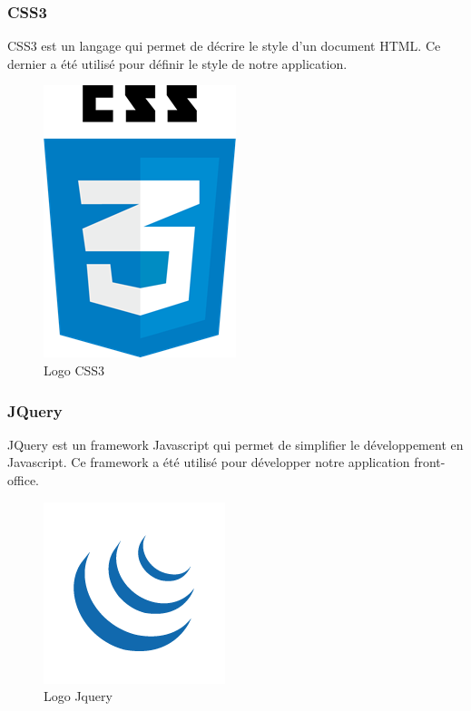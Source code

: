 \subsubsection{CSS3}
\noindent\begin{minipage}{0.69\textwidth}
CSS3 est un langage qui permet de décrire le style d'un document HTML. Ce dernier a été utilisé pour définir le style de notre application.
\end{minipage}
\begin{minipage}{0.3\textwidth}
\begin{figure}[H]
  \centering
  \includegraphics[scale=0.35]{figures/logo/css.png}
  \caption{Logo CSS3}
  \label{code46}
\end{figure}
\end{minipage}
\subsubsection{JQuery}
\noindent\begin{minipage}{0.69\textwidth}
JQuery est un framework Javascript qui permet de simplifier le développement en Javascript. Ce framework a été utilisé pour développer notre application front-office.
\end{minipage}
\begin{minipage}{0.3\textwidth}
\begin{figure}[H]
  \centering
  \includegraphics[scale=0.35]{figures/logo/jquery.png}
  \caption{Logo Jquery}
  \label{code47}
\end{figure}
\end{minipage}

